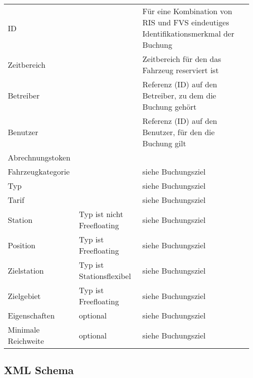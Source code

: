 \begin{flushleft}
\begin{tabularx}{\linewidth}{l>{\raggedright\arraybackslash}l>{\raggedright\arraybackslash}X} 
\toprule
ID & & Für eine Kombination von RIS und FVS eindeutiges Identifikationsmerkmal der Buchung \\
Zeitbereich & & Zeitbereich für den das Fahrzeug reserviert ist \\
Betreiber & & Referenz (ID) auf den Betreiber, zu dem die Buchung gehört \\
Benutzer & & Referenz (ID) auf den Benutzer, für den die Buchung gilt \\
Abrechnungstoken & & \\
Fahrzeugkategorie & & siehe Buchungsziel \\
Typ & & siehe Buchungsziel \\
Tarif & & siehe Buchungsziel \\
Station & Typ ist nicht Freefloating & siehe Buchungsziel \\
Position & Typ ist Freefloating & siehe Buchungsziel \\
Zielstation & Typ ist Stationsflexibel & siehe Buchungsziel \\
Zielgebiet & Typ ist Freefloating & siehe Buchungsziel \\
Eigenschaften & optional & siehe Buchungsziel \\
Minimale Reichweite & optional & siehe Buchungsziel \\
\bottomrule
\end{tabularx}
\end{flushleft}


\subsection{XML Schema}


